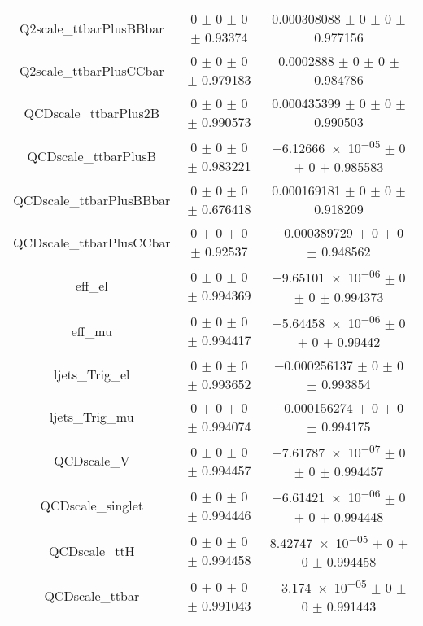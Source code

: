 \begin{table}
\begin{tabular}{ccc}
Q2scale\_ttbarPlusBBbar & \num{0} $\pm$ \num{0} $\pm$ \num{0} $\pm$ \num{0.93374} & \num{0.000308088} $\pm$ \num{0} $\pm$ \num{0} $\pm$ \num{0.977156}\\
Q2scale\_ttbarPlusCCbar & \num{0} $\pm$ \num{0} $\pm$ \num{0} $\pm$ \num{0.979183} & \num{0.0002888} $\pm$ \num{0} $\pm$ \num{0} $\pm$ \num{0.984786}\\
QCDscale\_ttbarPlus2B & \num{0} $\pm$ \num{0} $\pm$ \num{0} $\pm$ \num{0.990573} & \num{0.000435399} $\pm$ \num{0} $\pm$ \num{0} $\pm$ \num{0.990503}\\
QCDscale\_ttbarPlusB & \num{0} $\pm$ \num{0} $\pm$ \num{0} $\pm$ \num{0.983221} & \num{-6.12666e-05} $\pm$ \num{0} $\pm$ \num{0} $\pm$ \num{0.985583}\\
QCDscale\_ttbarPlusBBbar & \num{0} $\pm$ \num{0} $\pm$ \num{0} $\pm$ \num{0.676418} & \num{0.000169181} $\pm$ \num{0} $\pm$ \num{0} $\pm$ \num{0.918209}\\
QCDscale\_ttbarPlusCCbar & \num{0} $\pm$ \num{0} $\pm$ \num{0} $\pm$ \num{0.92537} & \num{-0.000389729} $\pm$ \num{0} $\pm$ \num{0} $\pm$ \num{0.948562}\\
eff\_el & \num{0} $\pm$ \num{0} $\pm$ \num{0} $\pm$ \num{0.994369} & \num{-9.65101e-06} $\pm$ \num{0} $\pm$ \num{0} $\pm$ \num{0.994373}\\
eff\_mu & \num{0} $\pm$ \num{0} $\pm$ \num{0} $\pm$ \num{0.994417} & \num{-5.64458e-06} $\pm$ \num{0} $\pm$ \num{0} $\pm$ \num{0.99442}\\
ljets\_Trig\_el & \num{0} $\pm$ \num{0} $\pm$ \num{0} $\pm$ \num{0.993652} & \num{-0.000256137} $\pm$ \num{0} $\pm$ \num{0} $\pm$ \num{0.993854}\\
ljets\_Trig\_mu & \num{0} $\pm$ \num{0} $\pm$ \num{0} $\pm$ \num{0.994074} & \num{-0.000156274} $\pm$ \num{0} $\pm$ \num{0} $\pm$ \num{0.994175}\\
QCDscale\_V & \num{0} $\pm$ \num{0} $\pm$ \num{0} $\pm$ \num{0.994457} & \num{-7.61787e-07} $\pm$ \num{0} $\pm$ \num{0} $\pm$ \num{0.994457}\\
QCDscale\_singlet & \num{0} $\pm$ \num{0} $\pm$ \num{0} $\pm$ \num{0.994446} & \num{-6.61421e-06} $\pm$ \num{0} $\pm$ \num{0} $\pm$ \num{0.994448}\\
QCDscale\_ttH & \num{0} $\pm$ \num{0} $\pm$ \num{0} $\pm$ \num{0.994458} & \num{8.42747e-05} $\pm$ \num{0} $\pm$ \num{0} $\pm$ \num{0.994458}\\
QCDscale\_ttbar & \num{0} $\pm$ \num{0} $\pm$ \num{0} $\pm$ \num{0.991043} & \num{-3.174e-05} $\pm$ \num{0} $\pm$ \num{0} $\pm$ \num{0.991443}\\

\end{tabular}
\end{table}

